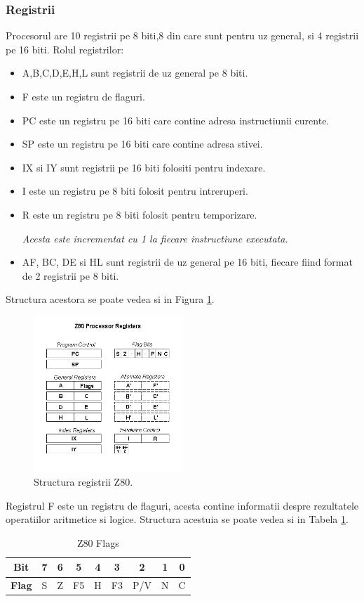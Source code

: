 \documentclass[titlepage,12pt]{article}
\begin{document}
\subsubsection{Registrii}
\cite{ref:z80instructions}Procesorul are 10 registrii pe 8 biti,8 din care sunt pentru uz general, si 4 registrii pe 16 biti.
Rolul registrilor:
\begin{itemize}
    \item A,B,C,D,E,H,L sunt registrii de uz general pe 8 biti.
    \item F este un registru de flaguri.
    \item PC este un registru pe 16 biti care contine adresa instructiunii curente.
    \item SP este un registru pe 16 biti care contine adresa stivei.
    \item IX si IY sunt registrii pe 16 biti folositi pentru indexare.
    \item I este un registru pe 8 biti folosit pentru intreruperi.
    \item R este un registru pe 8 biti folosit pentru temporizare.
    \par \hspace{1em} \textit{Acesta este incrementat cu 1 la fiecare instructiune executata.}
    \item AF, BC, DE si HL sunt registrii de uz general pe 16 biti, fiecare fiind format de 2 registrii pe 8 biti.
\end{itemize}
Structura acestora se poate vedea si in Figura \ref{fig:z80registers}.
\begin{figure}[H]
    \centering
    \includegraphics[width=0.5\textwidth]{images/z80registers.jpg}
    \caption{Structura registrii Z80. \cite{ref:z80registers}}
    \label{fig:z80registers}
\end{figure}

Registrul F este un registru de flaguri, acesta contine informatii despre rezultatele operatiilor aritmetice si logice.
Structura acestuia se poate vedea si in Tabela \ref{tab:z80flags}.
\begin{table}[h]
    \centering
    \begin{tabular}{|c|c|c|c|c|c|c|c|c|}
    \hline
    \textbf{Bit} & 7 & 6 & 5 & 4 & 3 & 2 & 1 & 0 \\
    \hline
    \textbf{Flag} & S & Z & F5 & H & F3 & P/V & N & C \\
    \hline
    \end{tabular}
    \caption{Z80 Flags}
    \label{tab:z80flags}
\end{table}
\end{document}
